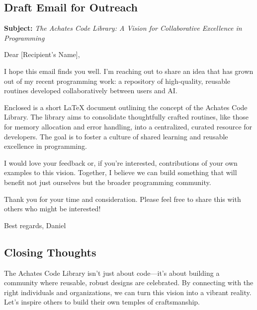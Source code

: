 \documentclass[12pt]{article}
\begin{document}
\subsection*{Draft Email for Outreach}
\textbf{Subject:} \textit{The Achates Code Library: A Vision for Collaborative Excellence in Programming}  

Dear [Recipient's Name],  

I hope this email finds you well. I’m reaching out to share an idea that has grown out of my recent programming work: a repository of high-quality, reusable routines developed collaboratively between users and AI.  

Enclosed is a short LaTeX document outlining the concept of the Achates Code Library. The library aims to consolidate thoughtfully crafted routines, like those for memory allocation and error handling, into a centralized, curated resource for developers. The goal is to foster a culture of shared learning and reusable excellence in programming.  

I would love your feedback or, if you’re interested, contributions of your own examples to this vision. Together, I believe we can build something that will benefit not just ourselves but the broader programming community.  

Thank you for your time and consideration. Please feel free to share this with others who might be interested!  

Best regards,  
Daniel  

\subsection*{Closing Thoughts}
The Achates Code Library isn’t just about code—it’s about building a community where reusable, robust designs are celebrated. By connecting with the right individuals and organizations, we can turn this vision into a vibrant reality. Let’s inspire others to build their own temples of craftsmanship.
\end{document}
